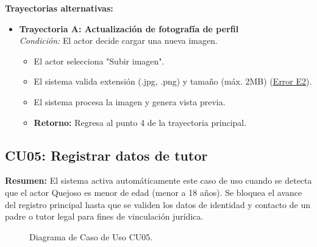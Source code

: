 \begin{appendices}
\textbf{Trayectorias alternativas:}
\begin{itemize}[leftmargin=*]
    \item \textbf{Trayectoria A: Actualización de fotografía de perfil} \\
    \textit{Condición:} El actor decide cargar una nueva imagen.
    \begin{itemize}[nosep]
        \item[A-1:] El actor selecciona "Subir imagen".
        \item[A-2:] El sistema valida extensión (.jpg, .png) y tamaño (máx. 2MB) (\hyperlink{err:E7}{Error E2}).
        \item[A-3:] El sistema procesa la imagen y genera vista previa.
        \item \textbf{Retorno:} Regresa al punto 4 de la trayectoria principal.
    \end{itemize}
\end{itemize}

\newpage

\subsection{CU05: Registrar datos de tutor}

\textbf{Resumen:} 
El sistema activa automáticamente este caso de uso cuando se detecta que el actor Quejoso es menor de edad (menor a 18 años). Se bloquea el avance del registro principal hasta que se validen los datos de identidad y contacto de un padre o tutor legal para fines de vinculación jurídica.

\begin{figure}[htbp]
    \centering
    \figCUcinco
    \caption{Diagrama de Caso de Uso CU05.}
    \label{fig:cu05}
\end{figure}


\end{appendices}

